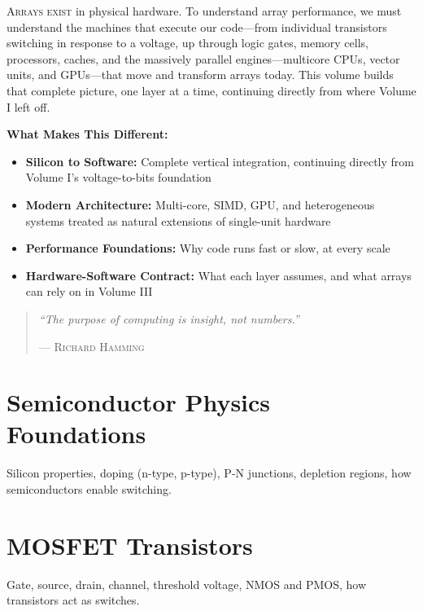 \begin{partintro}
\lettrine[lines=3]{A}{rrays exist} in physical hardware. To understand array performance, we must understand the machines that execute our code---from individual transistors switching in response to a voltage, up through logic gates, memory cells, processors, caches, and the massively parallel engines---multicore CPUs, vector units, and GPUs---that move and transform arrays today. This volume builds that complete picture, one layer at a time, continuing directly from where Volume I left off.

\vspace{1em}
\textbf{What Makes This Different:}
\begin{itemize}[noitemsep]
    \item \textbf{Silicon to Software:} Complete vertical integration, continuing directly from Volume I's voltage-to-bits foundation
    \item \textbf{Modern Architecture:} Multi-core, SIMD, GPU, and heterogeneous systems treated as natural extensions of single-unit hardware
    \item \textbf{Performance Foundations:} Why code runs fast or slow, at every scale
    \item \textbf{Hardware-Software Contract:} What each layer assumes, and what arrays can rely on in Volume III
\end{itemize}

\begin{quote}
\textit{``The purpose of computing is insight, not numbers.''}

\hfill--- \textsc{Richard Hamming}
\end{quote}
\end{partintro}


\chapter{Semiconductor Physics Foundations}
Silicon properties, doping (n-type, p-type), P-N junctions, depletion regions, how semiconductors enable switching.

\chapter{MOSFET Transistors}
Gate, source, drain, channel, threshold voltage, NMOS and PMOS, how transistors act as switches.

